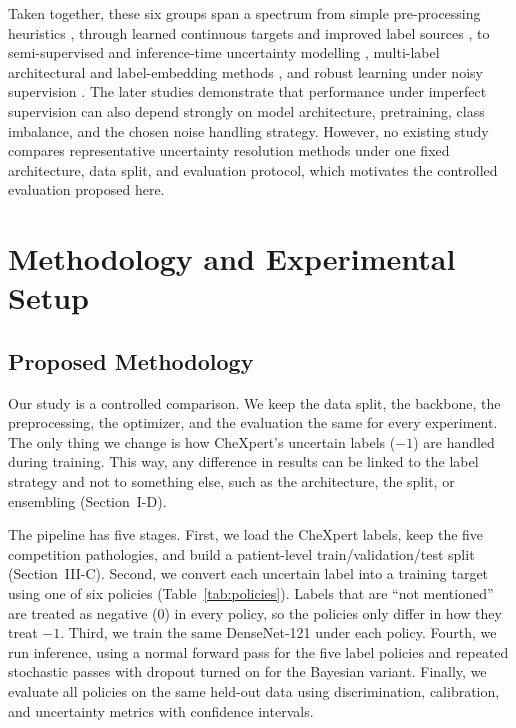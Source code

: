 \documentclass[conference]{IEEEtran}
\begin{document}
Taken together, these six groups span a spectrum from simple pre-processing heuristics \cite{ref1,ref2,ref3}, through learned continuous targets \cite{ref5} and improved label sources \cite{ref4,ref6}, to semi-supervised and inference-time uncertainty modelling \cite{ref7,ref8,ref11,ref12}, multi-label architectural and label-embedding methods \cite{ref9,ref10,ref13,ref16}, and robust learning under noisy supervision \cite{ref14,ref15,ref17}. The later studies demonstrate that performance under imperfect supervision can also depend strongly on model architecture, pretraining, class imbalance, and the chosen noise handling strategy. However, no existing study compares representative uncertainty resolution methods under one fixed architecture, data split, and evaluation protocol, which motivates the controlled evaluation proposed here.

\section{Methodology and Experimental Setup}

\subsection{Proposed Methodology}

Our study is a controlled comparison. We keep the data split, the backbone, the preprocessing, the optimizer, and the evaluation the same for every experiment. The only thing we change is how CheXpert's uncertain labels ($-1$) are handled during training. This way, any difference in results can be linked to the label strategy and not to something else, such as the architecture, the split, or ensembling (Section~I-D).

The pipeline has five stages. First, we load the CheXpert labels, keep the five competition pathologies, and build a patient-level train/validation/test split (Section~III-C). Second, we convert each uncertain label into a training target using one of six policies (Table~\ref{tab:policies}). Labels that are ``not mentioned'' are treated as negative ($0$) in every policy, so the policies only differ in how they treat $-1$. Third, we train the same DenseNet-121 under each policy. Fourth, we run inference, using a normal forward pass for the five label policies and repeated stochastic passes with dropout turned on for the Bayesian variant. Finally, we evaluate all policies on the same held-out data using discrimination, calibration, and uncertainty metrics with confidence intervals.
\end{document}
